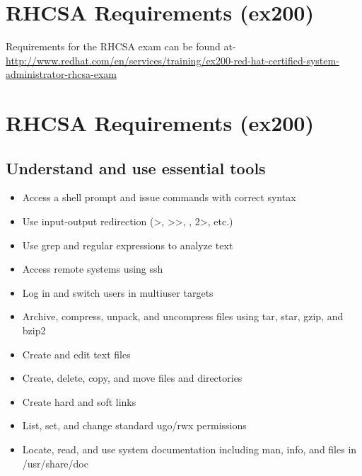 \documentclass[letterpaper,10pt,english]{sphinxmanual}
\begin{document}
\section{RHCSA Requirements (ex200)}
\label{intro:rhcsa-requirements-ex200}
Requirements for the RHCSA exam can be found at-
\href{http://www.redhat.com/en/services/training/ex200-red-hat-certified-system-administrator-rhcsa-exam}{http://www.redhat.com/en/services/training/ex200-red-hat-certified-system-administrator-rhcsa-exam}


\section{RHCSA Requirements (ex200)}
\label{intro:id1}

\subsection{Understand and use essential tools}
\label{intro:understand-and-use-essential-tools}\begin{itemize}
\item {} 
Access a shell prompt and issue commands with correct syntax

\item {} 
Use input-output redirection (\textgreater{}, \textgreater{}\textgreater{}, \textbar{}, 2\textgreater{}, etc.)

\item {} 
Use grep and regular expressions to analyze text

\item {} 
Access remote systems using ssh

\item {} 
Log in and switch users in multiuser targets

\item {} 
Archive, compress, unpack, and uncompress files using tar, star, gzip, and bzip2

\end{itemize}
\begin{itemize}
\item {} 
Create and edit text files

\item {} 
Create, delete, copy, and move files and directories

\item {} 
Create hard and soft links

\item {} 
List, set, and change standard ugo/rwx permissions

\item {} 
Locate, read, and use system documentation including man, info, and files in /usr/share/doc

\end{itemize}
\end{document}

